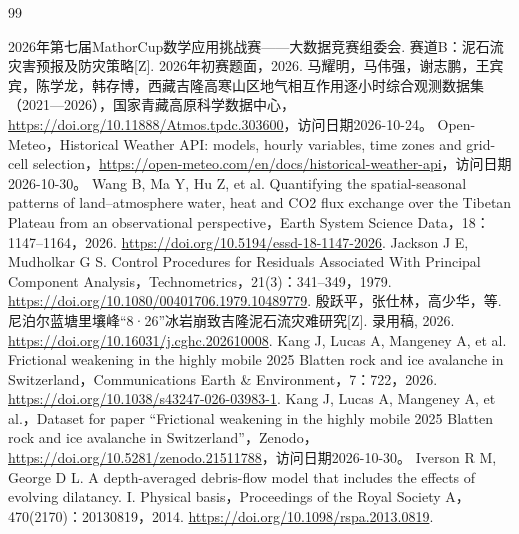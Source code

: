 \documentclass[withoutpreface]{cumcmthesis}
\begin{document}
\FloatBarrier
{}
\renewcommand{\refname}{\chinese{section}、\quad 参考文献}
\begin{thebibliography}{99}
\small
\raggedright
{} 2026年第七届MathorCup数学应用挑战赛——大数据竞赛组委会. 赛道B：泥石流灾害预报及防灾策略[Z]. 2026年初赛题面，2026.
 马耀明，马伟强，谢志鹏，王宾宾，陈学龙，韩存博，西藏吉隆高寒山区地气相互作用逐小时综合观测数据集（2021—2026），国家青藏高原科学数据中心，\url{https://doi.org/10.11888/Atmos.tpdc.303600}，访问日期2026-10-24。
 Open-Meteo，Historical Weather API: models, hourly variables, time zones and grid-cell selection，\url{https://open-meteo.com/en/docs/historical-weather-api}，访问日期2026-10-30。
 Wang B, Ma Y, Hu Z, et al. Quantifying the spatial-seasonal patterns of land–atmosphere water, heat and CO2 flux exchange over the Tibetan Plateau from an observational perspective，Earth System Science Data，18：1147–1164，2026. \url{https://doi.org/10.5194/essd-18-1147-2026}.
 Jackson J E, Mudholkar G S. Control Procedures for Residuals Associated With Principal Component Analysis，Technometrics，21(3)：341–349，1979. \url{https://doi.org/10.1080/00401706.1979.10489779}.
 殷跃平，张仕林，高少华，等. 尼泊尔蓝塘里壤峰“8·26”冰岩崩致吉隆泥石流灾难研究[Z]. 录用稿, 2026. \url{https://doi.org/10.16031/j.cghc.202610008}.
 Kang J, Lucas A, Mangeney A, et al. Frictional weakening in the highly mobile 2025 Blatten rock and ice avalanche in Switzerland，Communications Earth \& Environment，7：722，2026. \url{https://doi.org/10.1038/s43247-026-03983-1}.
 Kang J, Lucas A, Mangeney A, et al.，Dataset for paper “Frictional weakening in the highly mobile 2025 Blatten rock and ice avalanche in Switzerland”，Zenodo，\url{https://doi.org/10.5281/zenodo.21511788}，访问日期2026-10-30。
 Iverson R M, George D L. A depth-averaged debris-flow model that includes the effects of evolving dilatancy. I. Physical basis，Proceedings of the Royal Society A，470(2170)：20130819，2014. \url{https://doi.org/10.1098/rspa.2013.0819}.


\end{thebibliography}
\end{document}
